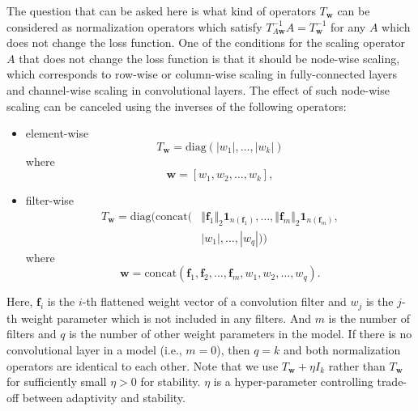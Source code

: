 \documentclass{article}
\newcommand{\mf}[1]{\mathbf{#1}}
\begin{document}
The question that can be asked here is what kind of operators $T_\mf{w}$ can be considered as normalization operators which satisfy $T_{A\mf{w}}^{-1}A=T_\mf{w}^{-1}$ for any $A$ which does not change the loss function. One of the conditions for the scaling operator $A$ that does not change the loss function is that it should be node-wise scaling, which corresponds to row-wise or column-wise scaling in fully-connected layers and channel-wise scaling in convolutional layers. The effect of such node-wise scaling can be canceled using the inverses of the following operators:
\begin{itemize}
	\item element-wise
	\[T_\mf{w} = \mathrm{diag}(|w_1|, \ldots, |w_k|)\]
	where
    \[\mf{w} = [w_1, w_2, \ldots, w_k],\]
\item filter-wise
	\begin{align}\label{filterwise}
	\nonumber T_\mf{w} = \mathrm{diag}(\mathrm{concat}(&\Vert \mf{f}_1\Vert _2 \mf{1}_{n(\mf{f}_1)}, \ldots, \Vert \mf{f}_m\Vert _2\mf{1}_{n(\mf{f}_m)},\\  &|w_1|, \ldots, |w_q|))
	\end{align}
	where
    \[\mf{w} = \mathrm{concat}(\mf{f}_1, \mf{f}_2, \ldots, \mf{f}_m, w_1, w_2, \ldots, w_q).\]
\end{itemize}

Here, $\mf{f}_i$ is the $i$-th flattened weight vector of a convolution filter and $w_j$ is the $j$-th weight parameter which is not included in any filters. And $m$ is the number of filters and $q$ is the number of other weight parameters in the model. If there is no convolutional layer in a model (i.e., $m=0$), then $q=k$ and both normalization operators are identical to each other.
Note that we use $T_\mf{w} + \eta I_k$ rather than $T_\mf{w}$ for sufficiently small $\eta > 0$ for stability.
$\eta$ is a hyper-parameter controlling trade-off between adaptivity and stability. 
\end{document}
